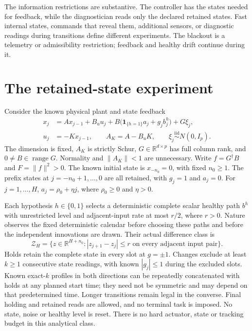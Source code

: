 \documentclass[journal]{IEEEtran}
\begin{document}
The information restrictions are substantive. The controller has the states
needed for feedback, while the diagnostician reads only the declared retained
states. Fast internal states, commands that reveal them, additional sensors,
or diagnostic readings during transitions define different experiments.
The blackout is a telemetry or admissibility restriction; feedback and
healthy drift continue during it.

\section{The retained-state experiment}\label{sf:model}
Consider the known physical plant and state feedback
\begin{equation}\label{sf:plant}
\begin{split}
x_j&=Ax_{j-1}+B_u u_j+B\bigl(\mathbf1_{\{h=1\}}a_j+g_jb_j^h\bigr)+G\xi_j,\\
u_j&=-Kx_{j-1},\qquad A_K=A-B_uK,\qquad
\xi_j\overset{\mathrm{iid}}{\sim}N(0,I_p).
\end{split}
\end{equation}
The dimension is fixed, $A_K$ is strictly Schur, $G\in\mathbb R^{d\times p}$
has full column rank, and $0\ne B\in\operatorname{range}G$.
Normality and $\|A_K\|<1$ are unnecessary. Write
$f=G^\dagger B$ and $F=\|f\|^2>0$. The known initial state is
$x_{-n_0}=0$, with fixed $n_0\ge1$. The prefix states at
$j=-n_0+1,\ldots,0$ are all retained, with $g_j=1$ and $a_j=0$.
For $j=1,\ldots,H$, $a_j=\rho_0+\eta j$, where $\rho_0\ge0$ and $\eta>0$.

Each hypothesis $h\in\{0,1\}$ selects a deterministic complete scalar healthy
path $b^h$ with unrestricted level and adjacent-input rate at most $r/2$,
where $r>0$. Nature observes the fixed deterministic calendar before choosing
these paths and before the independent innovations are drawn. Their actual
difference class is
\begin{equation}\label{sf:path}
\mathcal Z_H=\{z\in\mathbb R^{H+n_0}:|z_{j+1}-z_j|\le r
\text{ on every adjacent input pair}\}.
\end{equation}
Holds retain the complete state in every slot at $g=\pm1$. Changes exclude
at least $k\ge1$ consecutive state readings, with known $|g_j|\le1$ during
the excluded slots. Known exact-$k$ profiles in both directions can be
repeatedly concatenated with holds at any planned start time; they need not
be symmetric and may depend on that predetermined time. Longer transitions
remain legal in the converse. Final holding and retained reads are allowed,
and no terminal task is imposed. No state, noise or healthy level is reset.
There is no hard actuator, state or tracking budget in this analytical class.
\end{document}
